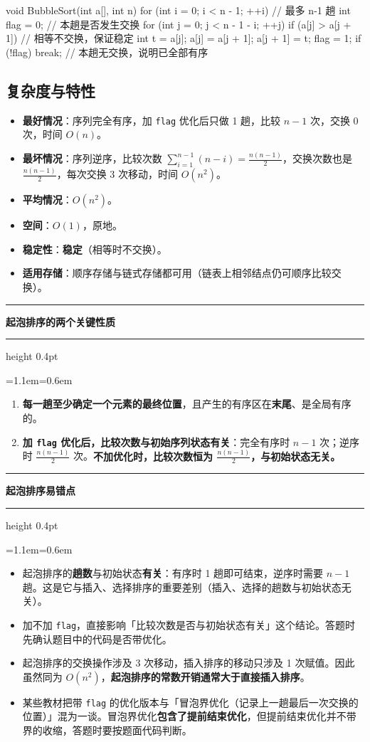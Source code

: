 \documentclass[11pt,openany,UTF8]{ctexbook}
\newcommand{\callouthead}[2]{%
  \par\addvspace{7pt}\noindent
  {\color{#1}\rule[-0.15em]{3pt}{1.05em}}\hspace{0.5em}%
  {\bfseries\color{#1}#2}\par\nobreak\vspace{-0.35em}%
  {\color{rulesep}\hrule height 0.4pt}\nobreak\vspace{0.45em}%
  \begingroup\small\setlength{\parindent}{0pt}%
  \leftskip=1.1em\rightskip=0.6em\noindent\ignorespaces}
\newcommand{\calloutend}{\par\endgroup\addvspace{7pt}}
\newenvironment{callkey}[1]{\callouthead{keybar}{#1}}{\calloutend}
\newenvironment{callwarn}[1]{\callouthead{warnbar}{#1}}{\calloutend}
\begin{document}
\begin{codebox}
void BubbleSort(int a[], int n) {
    for (int i = 0; i < n - 1; ++i) {   // 最多 n-1 趟
        int flag = 0;                    // 本趟是否发生交换
        for (int j = 0; j < n - 1 - i; ++j) {
            if (a[j] > a[j + 1]) {       // 相等不交换，保证稳定
                int t = a[j]; a[j] = a[j + 1]; a[j + 1] = t;
                flag = 1;
            }
        }
        if (!flag) break;                // 本趟无交换，说明已全部有序
    }
}
\end{codebox}

\subsection{复杂度与特性}

\begin{itemize}
\item \textbf{最好情况}：序列完全有序，加 \texttt{flag} 优化后只做 1 趟，比较 $n-1$ 次，交换 0 次，时间 $O(n)$。
\item \textbf{最坏情况}：序列逆序，比较次数 $\sum_{i=1}^{n-1}(n-i)=\frac{n(n-1)}{2}$，交换次数也是 $\frac{n(n-1)}{2}$，每次交换 3 次移动，时间 $O(n^2)$。
\item \textbf{平均情况}：$O(n^2)$。
\item \textbf{空间}：$O(1)$，原地。
\item \textbf{稳定性}：\textbf{稳定}（相等时不交换）。
\item \textbf{适用存储}：顺序存储与链式存储都可用（链表上相邻结点仍可顺序比较交换）。
\end{itemize}
\begin{callkey}{起泡排序的两个关键性质}
\begin{enumerate}
\item \textbf{每一趟至少确定一个元素的最终位置}，且产生的有序区在\textbf{末尾}、是全局有序的。
\item \textbf{加 \texttt{flag} 优化后，比较次数与初始序列状态有关}：完全有序时 $n-1$ 次；逆序时 $\frac{n(n-1)}{2}$ 次。\textbf{不加优化时，比较次数恒为 $\frac{n(n-1)}{2}$，与初始状态无关。}
\end{enumerate}
\end{callkey}

\begin{callwarn}{起泡排序易错点}
\begin{itemize}
\item 起泡排序的\textbf{趟数}与初始状态\textbf{有关}：有序时 1 趟即可结束，逆序时需要 $n-1$ 趟。这是它与插入、选择排序的重要差别（插入、选择的趟数与初始状态无关）。
\item 加不加 \texttt{flag}，直接影响「比较次数是否与初始状态有关」这个结论。答题时先确认题目中的代码是否带优化。
\item 起泡排序的交换操作涉及 3 次移动，插入排序的移动只涉及 1 次赋值。因此虽然同为 $O(n^2)$，\textbf{起泡排序的常数开销通常大于直接插入排序}。
\item 某些教材把带 \texttt{flag} 的优化版本与「冒泡界优化（记录上一趟最后一次交换的位置）」混为一谈。冒泡界优化\textbf{包含了提前结束优化}，但提前结束优化并不带界的收缩，答题时要按题面代码判断。
\end{itemize}
\end{callwarn}
\end{document}
